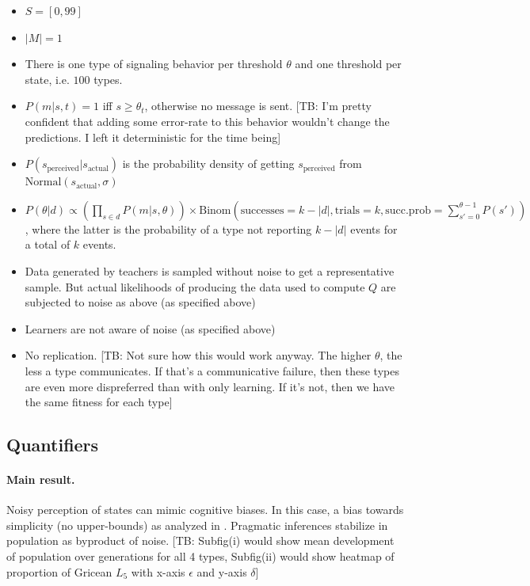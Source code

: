 \documentclass[10pt,a4paper]{article}
\newcommand{\tb}[1]{\textcolor[rgb]{.8,.33,.0}{[TB: #1]}}%
\begin{document}
\begin{itemize}
  \item $S = [0,99]$
  \item $|M| = 1$
  \item There is one type of signaling behavior per threshold $\theta$ and one threshold per state, i.e. $100$ types.
  \item $P(m|s,t) = 1$ iff $s \geq \theta_t$, otherwise no message is sent. \tb{I'm pretty confident that adding some error-rate to this behavior wouldn't change the predictions. I left it deterministic for the time being}
  \item $P(s_{\text{perceived}} | s_{\text{actual}})$ is the probability density of getting $s_{\text{perceived}}$ from $\text{Normal}(s_{\text{actual}},\sigma)$
  \item $P(\theta | d) \propto (\prod_{s \in d} P(m|s,\theta)) \times \text{Binom}(\text{successes} = k-|d|, \text{trials} = k, \text{succ.prob} = \sum_{s'=0}^{\theta-1} P(s'))$, where the latter is the probability of a type not reporting $k-|d|$ events for a total of $k$ events.
  \item Data generated by teachers is sampled without noise to get a representative sample. But actual likelihoods of producing the data used to compute $Q$ are subjected to noise as above (as specified above)
  \item Learners are not aware of noise (as specified above)
  \item No replication. \tb{Not sure how this would work anyway. The higher $\theta$, the less a type communicates. If that's a communicative failure, then these types are even more dispreferred than with only learning. If it's not, then we have the same fitness for each type}
\end{itemize}

\subsection{Quantifiers}
\paragraph{Main result.} Noisy perception of states can mimic cognitive biases. In this case, a bias towards simplicity (no upper-bounds) as analyzed in \citet{brochhagen+etal:2016:CogSci}. Pragmatic inferences stabilize in population as byproduct of noise. \tb{Subfig(i) would show mean development of population over generations for all 4 types, Subfig(ii) would show heatmap of proportion of Gricean $L_5$ with x-axis $\epsilon$ and y-axis $\delta$}
\end{document}
